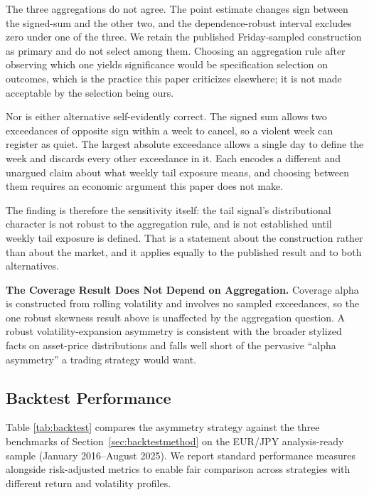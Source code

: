 \documentclass[11pt]{article}
\begin{document}
The three aggregations do not agree. The point estimate changes sign between the signed-sum and the other two, and the dependence-robust interval excludes zero under one of the three. We retain the published Friday-sampled construction as primary and do not select among them. Choosing an aggregation rule after observing which one yields significance would be specification selection on outcomes, which is the practice this paper criticizes elsewhere; it is not made acceptable by the selection being ours.

Nor is either alternative self-evidently correct. The signed sum allows two exceedances of opposite sign within a week to cancel, so a violent week can register as quiet. The largest absolute exceedance allows a single day to define the week and discards every other exceedance in it. Each encodes a different and unargued claim about what weekly tail exposure means, and choosing between them requires an economic argument this paper does not make.

The finding is therefore the sensitivity itself: the tail signal's distributional character is not robust to the aggregation rule, and is not established until weekly tail exposure is defined. That is a statement about the construction rather than about the market, and it applies equally to the published result and to both alternatives.

\textbf{The Coverage Result Does Not Depend on Aggregation.} Coverage alpha is constructed from rolling volatility and involves no sampled exceedances, so the one robust skewness result above is unaffected by the aggregation question. A robust volatility-expansion asymmetry is consistent with the broader stylized facts on asset-price distributions \citep{cont2001empirical, mandelbrot1963variation} and falls well short of the pervasive ``alpha asymmetry'' a trading strategy would want.

\subsection{Backtest Performance}
\label{sec:backtest}

Table \ref{tab:backtest} compares the asymmetry strategy against the three benchmarks of Section~\ref{sec:backtestmethod} on the EUR/JPY analysis-ready sample (January 2016--August 2025). We report standard performance measures alongside risk-adjusted metrics to enable fair comparison across strategies with different return and volatility profiles.
\end{document}
